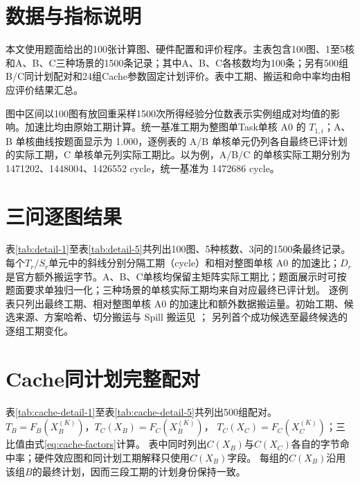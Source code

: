 \appendix
{}

\section{数据与指标说明}\label{app:provenance}
本文使用题面给出的100张计算图、硬件配置和评价程序。主表包含100图、1至5核和A、B、C三种场景的1500条记录；其中A、B、C各核数均为100条；另有500组B/C同计划配对和24组Cache参数固定计划评价。表中工期、搬运和命中率均由相应评价结果汇总。

图中区间以100图有放回重采样1500次所得经验分位数表示实例组成对均值的影响。加速比均由原始工期计算。统一基准工期为整图单Task单核 A0 的 $T_{1,i}$；A、B 单核曲线按题面显示为 1.000，逐例表的 A/B 单核单元仍列各自最终已评计划的实际工期，C 单核单元列实际工期比。以为例，A/B/C 的单核实际工期分别为 1471202、1448004、1426552 cycle，统一基准为 1472686 cycle。

\section{三问逐图结果}\label{app:results}
表\ref{tab:detail-1}至表\ref{tab:detail-5}共列出100图、5种核数、3问的1500条最终记录。
每个$T_r/S_r$单元中的斜线分别分隔工期（cycle）和相对整图单核 A0 的加速比；$D_r$是官方额外搬运字节。A、B、C单核均保留主矩阵实际工期比；题面展示时可按题面要求单独归一化；三种场景的单核实际工期均来自对应最终已评计划。
逐例表只列出最终工期、相对整图单核 A0 的加速比和额外数据搬运量。初始工期、候选来源、方案哈希、切分搬运与 Spill 搬运见 ； 另列首个成功候选至最终候选的逐组工期变化。
\begingroup
\small
\setlength{\tabcolsep}{2.5pt}
\setlength{\LTleft}{\fill}\setlength{\LTright}{\fill}
\renewcommand{\arraystretch}{1.03}

\endgroup

\section{Cache同计划完整配对}\label{app:cache}
表\ref{tab:cache-detail-1}至表\ref{tab:cache-detail-5}共列出500组配对。
$T_B=F_B(X_B^{(K)})$，$T_C(X_B)=F_C(X_B^{(K)})$，
$T_C(X_C)=F_C(X_C^{(K)})$；三比值由式\eqref{eq:cache-factors}计算。
表中同时列出$C(X_B)$与$C(X_C)$各自的字节命中率；硬件效应图和同计划工期解释只使用$C(X_B)$字段。
每组的$C(X_B)$沿用该组$B$的最终计划，因而三段工期的计划身份保持一致。
\begingroup
\scriptsize
\setlength{\tabcolsep}{2pt}
\setlength{\LTleft}{\fill}\setlength{\LTright}{\fill}
\renewcommand{\arraystretch}{1.03}

\endgroup

